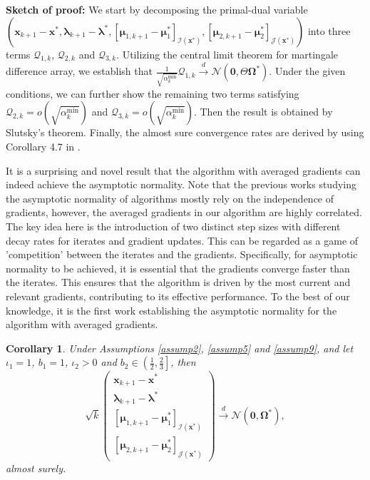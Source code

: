 \documentclass[aos]{imsart}
\numberwithin{equation}{section}
\theoremstyle{plain}
\newtheorem{corollary}{Corollary}
\begin{document}
\textbf{Sketch of proof:} We start by decomposing the primal-dual variable $(\bm{x}_{k+1} - \bm{x}^{*}, \bm{\lambda}_{k+1} - \bm{\lambda}^{*}, \left[ \bm{\mu}_{1,k+1} - \bm{\mu}_{1}^{*}\right]_{\mathcal{I}(\bm{x}^{*})}, \left[ \bm{\mu}_{2,k+1} - \bm{\mu}_{2}^{*} \right]_{\mathcal{J}(\bm{x}^{*})})$ into three terms $\mathcal{Q}_{1,k}$, $\mathcal{Q}_{2,k}$ and $\mathcal{Q}_{3,k}$. Utilizing the central limit theorem for martingale difference array, we establish that $\frac{1}{\sqrt{\alpha_k^{\text{min}}}} \mathcal{Q}_{1,k} \stackrel{d}{\longrightarrow} \mathcal{N} \left( \bm{0}, \Theta \bm{\Omega}^{*} \right)$. Under the given conditions, we can further show the remaining two terms satisfying $\mathcal{Q}_{2,k} = o\left( \sqrt{\alpha_k^{\text{min}}}\right)$ and $\mathcal{Q}_{3,k} = o\left( \sqrt{\alpha_k^{\text{min}}}\right)$. Then the result is obtained by Slutsky's theorem. Finally, the almost sure convergence rates are derived by using Corollary 4.7 in \cite{hao2014convergence}.


It is a surprising and novel result that the algorithm with averaged gradients can indeed achieve the asymptotic normality. Note that the previous works \cite{na2022asymptotic, chen2020statistical, leluc2020asymptotic, toulis2017asymptotic} studying the asymptotic normality of algorithms mostly rely on the independence of gradients, however, the averaged gradients in our algorithm are highly correlated. 
The key idea here is the introduction of two distinct step sizes with different decay rates for iterates and gradient updates. This can be regarded as a game of 'competition' between the iterates and the gradients. Specifically, for asymptotic normality to be achieved, it is essential that the gradients converge faster than the iterates. This ensures that the algorithm is driven by the most current and relevant gradients, contributing to its effective performance.
To the best of our knowledge, it is the first work establishing the asymptotic normality for the algorithm with averaged gradients. 

    


\begin{corollary}
\label{coro_optimality}
     Under Assumptions \ref{assump2}, \ref{assump5} and \ref{assump9}, and let $\iota_1 = 1$, $b_1 = 1$, $\iota_2 > 0$ and $b_2 \in \left( \frac{1}{2}, \frac{2}{3} \right]$, then 
    \begin{equation}
        \sqrt{k} \left( \begin{array}{c}
    \bm{x}_{k+1} - \bm{x}^{*}  \\
    \bm{\lambda}_{k+1} - \bm{\lambda}^{*} \\
    \left[ \bm{\mu}_{1,k+1} - \bm{\mu}_{1}^{*}\right]_{\mathcal{I}(\bm{x}^{*})} \\
    \left[ \bm{\mu}_{2,k+1} - \bm{\mu}_{2}^{*} \right]_{\mathcal{J}(\bm{x}^{*})} 
    \end{array} \right) \stackrel{d}{\longrightarrow} \mathcal{N} \left( \bm{0}, \bm{\Omega}^{*} \right),
    \end{equation}
    almost surely. 
\end{corollary}
\end{document}
